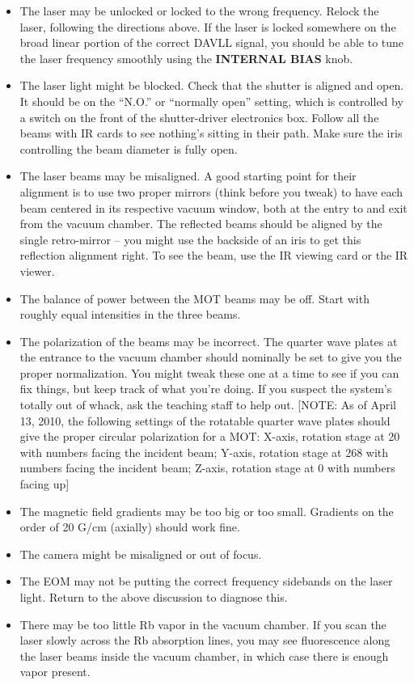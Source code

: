 \documentclass{../lab}
\begin{document}
\begin{itemize}
    \item The laser may be unlocked or locked to the wrong frequency. Relock the laser, following the directions above. If the laser is locked somewhere on the broad linear portion of the correct DAVLL signal, you should be able to tune the laser frequency smoothly using the \textbf{INTERNAL BIAS} knob.

    \item The laser light might be blocked. Check that the shutter is aligned and open. It should be on the ``N.O.'' or ``normally open'' setting, which is controlled by a switch on the front of the shutter-driver electronics box.  Follow all the beams with IR cards to see nothing's sitting in their path. Make sure the iris controlling the beam diameter is fully open. 

    \item The laser beams may be misaligned. A good starting point for their alignment is to use two proper mirrors (think before you tweak) to have each beam centered in its respective vacuum window, both at the entry to and exit from the vacuum chamber. The reflected beams should be aligned by the single retro-mirror -- you might use the backside of an iris to get this reflection alignment right. To see the beam, use the IR viewing card or the IR viewer.

    \item The balance of power between the MOT beams may be off. Start with roughly equal intensities in the three beams.

    \item The polarization of the beams may be incorrect. The quarter wave plates at the entrance to the vacuum chamber should nominally be set to give you the proper normalization. You might tweak these one at a time to see if you can fix things, but keep track of what you're doing. If you suspect the system's totally out of whack, ask the teaching staff to help out. [NOTE: As of April 13, 2010, the following settings of the rotatable quarter wave plates should give the proper circular polarization for a MOT: X-axis, rotation stage at 20 with numbers facing the incident beam; Y-axis, rotation stage at 268 with numbers facing the incident beam; Z-axis, rotation stage at 0 with numbers facing up]

    \item The magnetic field gradients may be too big or too small. Gradients on the order of 20 G/cm (axially) should work fine.

    \item The camera might be misaligned or out of focus.

    \item The EOM may not be putting the correct frequency sidebands on the laser light. Return to the above discussion to diagnose this.

    \item There may be too little Rb vapor in the vacuum chamber. If you scan the laser slowly across the Rb absorption lines, you may see fluorescence along the laser beams inside the vacuum chamber, in which case there is enough vapor present.
\end{itemize}
\end{document}
